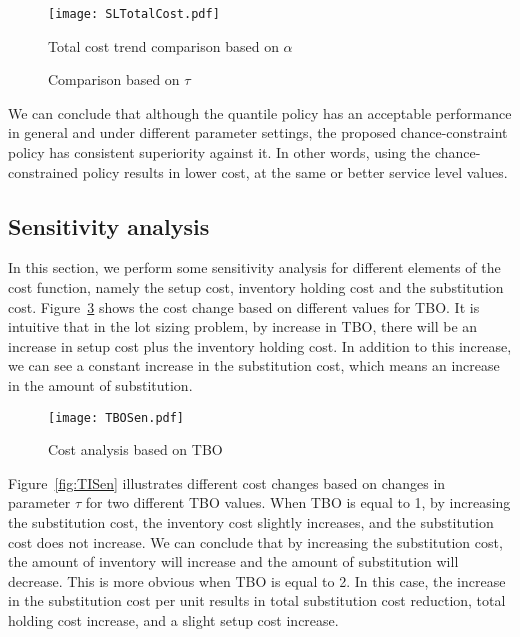 \documentclass[11pt]{article}
\begin{document}
\begin{figure}[!h]
\begin{center}
\texttt{[image: SLTotalCost.pdf]}
\caption{Total cost trend comparison based on $\alpha$} 
\label{fig:SLTotalCost}
\end{center}
\end{figure}


\begin{figure}[H]
    \centering
    \caption{Comparison based on $\tau$}%
    \label{fig:TIComp}%
\end{figure}


We can conclude that although the quantile policy has an acceptable performance in general and under different parameter settings, the proposed chance-constraint policy has consistent superiority against it. In other words, using the chance-constrained policy results in lower cost, at the same or better service level values.
\subsection{Sensitivity analysis}
In this section, we perform some sensitivity analysis for different elements of the cost function, namely the setup cost, inventory holding cost and the substitution cost. 
Figure~\ref{fig:TBOSen} shows the cost change based on different values for TBO. It is intuitive that in the lot sizing problem, by increase in TBO, there will be an increase in setup cost plus the inventory holding cost. In addition to this increase, we can see a constant increase in the substitution cost, which means an increase in the amount of substitution. 

\begin{figure}[H]
\begin{center}
\texttt{[image: TBOSen.pdf]}
\caption{Cost analysis based on TBO} 
\label{fig:TBOSen}
\end{center}
\end{figure}
Figure~\ref{fig:TISen} illustrates different cost changes based on changes in parameter $\tau$ for two different TBO values. When TBO is equal to 1, by increasing the substitution cost, the inventory cost slightly increases, and the substitution cost does not increase. We can conclude that by increasing the substitution cost, the amount of inventory will increase and the amount of substitution will decrease. This is more obvious when TBO is equal to 2. In this case, the increase in the substitution cost per unit results in total substitution cost reduction, total holding cost increase, and a slight setup cost increase.  
\end{document}
